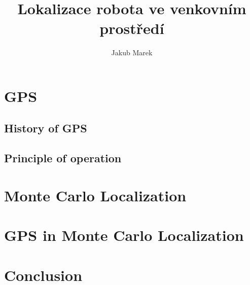 \documentclass[12pt,a4paper,pdftex]{memoir}
\title{Lokalizace robota ve venkovním prostředí}
\author{Jakub Marek}
\begin{document}






\chapter{GPS}

\section{History of GPS}

\section{Principle of operation}


\chapter{Monte Carlo Localization}

\chapter{GPS in Monte Carlo Localization}

\chapter{Conclusion}
\end{document}
